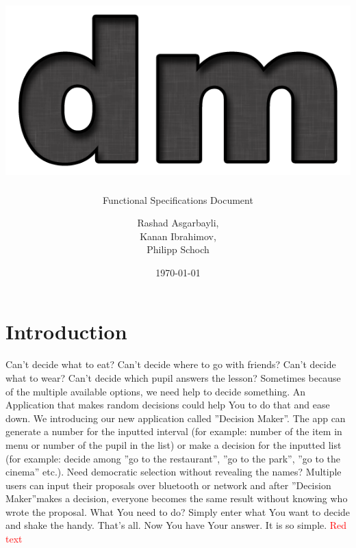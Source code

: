 \documentclass[hidelinks, a4paper, 11pt]{scrartcl}
\author{Rashad Asgarbayli,\\ Kanan Ibrahimov,\\ Philipp Schoch}
\title{\vspace{3cm}\includegraphics[scale=0.7]{Logo.png}\\ \app\vspace{20mm}}
\subtitle{Functional Specifications Document}
\date{\today}
\def\app{''Decision Maker''}
\def\com #1{\textcolor{red}{#1}}
\begin{document}
\maketitle
\thispagestyle{empty}

\newpage

\tableofcontents

\newpage


\section{Introduction}

\paragraph{}Can't decide what to eat? Can't decide where to go with friends? Can't decide what to wear? Can't decide which pupil answers the lesson? Sometimes because of the multiple available options, we need help to decide something. An Application that makes random decisions could help You to do that and ease down. We introducing our new application called \app. The app can generate a number for the inputted interval (for example: number of the item in menu or number of the pupil in the list) or make a decision for the inputted list (for example: decide among ''go to the restaurant'', ''go to the park'', ''go to the cinema'' etc.). Need democratic selection without revealing the names? Multiple users can input their proposals over bluetooth or network and after \app makes a decision, everyone becomes the same result without knowing who wrote the proposal. What You need to do? Simply enter what You want to decide and shake the handy. That's all. Now You have Your answer. It is so simple.
\com{Red text}




















\end{document}

